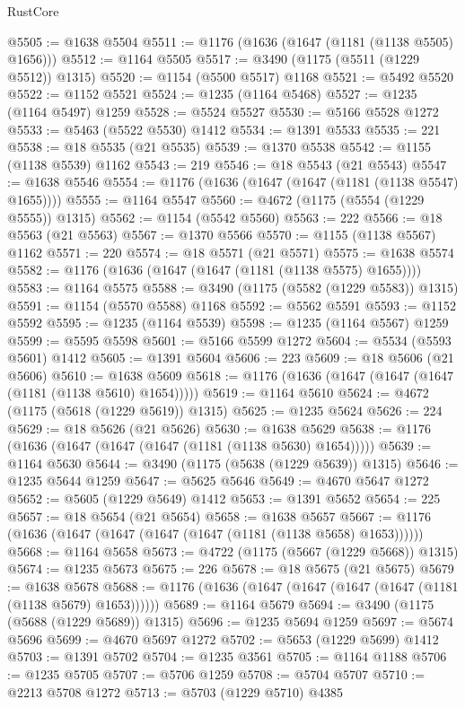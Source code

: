 \begin{lexlean}{RustCore}
\begin{coremodule}
@5505 := @1638 @5504
@5511 := @1176 (@1636 (@1647 (@1181 (@1138 @5505) @1656)))
@5512 := @1164 @5505
@5517 := @3490 (@1175 (@5511 (@1229 @5512)) @1315)
@5520 := @1154 (@5500 @5517) @1168
@5521 := @5492 @5520
@5522 := @1152 @5521
@5524 := @1235 (@1164 @5468)
@5527 := @1235 (@1164 @5497) @1259
@5528 := @5524 @5527
@5530 := @5166 @5528 @1272
@5533 := @5463 (@5522 @5530) @1412
@5534 := @1391 @5533
@5535 := 221
@5538 := @18 @5535 (@21 @5535)
@5539 := @1370 @5538
@5542 := @1155 (@1138 @5539) @1162
@5543 := 219
@5546 := @18 @5543 (@21 @5543)
@5547 := @1638 @5546
@5554 := @1176 (@1636 (@1647 (@1647 (@1181 (@1138 @5547) @1655))))
@5555 := @1164 @5547
@5560 := @4672 (@1175 (@5554 (@1229 @5555)) @1315)
@5562 := @1154 (@5542 @5560)
@5563 := 222
@5566 := @18 @5563 (@21 @5563)
@5567 := @1370 @5566
@5570 := @1155 (@1138 @5567) @1162
@5571 := 220
@5574 := @18 @5571 (@21 @5571)
@5575 := @1638 @5574
@5582 := @1176 (@1636 (@1647 (@1647 (@1181 (@1138 @5575) @1655))))
@5583 := @1164 @5575
@5588 := @3490 (@1175 (@5582 (@1229 @5583)) @1315)
@5591 := @1154 (@5570 @5588) @1168
@5592 := @5562 @5591
@5593 := @1152 @5592
@5595 := @1235 (@1164 @5539)
@5598 := @1235 (@1164 @5567) @1259
@5599 := @5595 @5598
@5601 := @5166 @5599 @1272
@5604 := @5534 (@5593 @5601) @1412
@5605 := @1391 @5604
@5606 := 223
@5609 := @18 @5606 (@21 @5606)
@5610 := @1638 @5609
@5618 := @1176 (@1636 (@1647 (@1647 (@1647 (@1181 (@1138 @5610) @1654)))))
@5619 := @1164 @5610
@5624 := @4672 (@1175 (@5618 (@1229 @5619)) @1315)
@5625 := @1235 @5624
@5626 := 224
@5629 := @18 @5626 (@21 @5626)
@5630 := @1638 @5629
@5638 := @1176 (@1636 (@1647 (@1647 (@1647 (@1181 (@1138 @5630) @1654)))))
@5639 := @1164 @5630
@5644 := @3490 (@1175 (@5638 (@1229 @5639)) @1315)
@5646 := @1235 @5644 @1259
@5647 := @5625 @5646
@5649 := @4670 @5647 @1272
@5652 := @5605 (@1229 @5649) @1412
@5653 := @1391 @5652
@5654 := 225
@5657 := @18 @5654 (@21 @5654)
@5658 := @1638 @5657
@5667 := @1176 (@1636 (@1647 (@1647 (@1647 (@1647 (@1181 (@1138 @5658) @1653))))))
@5668 := @1164 @5658
@5673 := @4722 (@1175 (@5667 (@1229 @5668)) @1315)
@5674 := @1235 @5673
@5675 := 226
@5678 := @18 @5675 (@21 @5675)
@5679 := @1638 @5678
@5688 := @1176 (@1636 (@1647 (@1647 (@1647 (@1647 (@1181 (@1138 @5679) @1653))))))
@5689 := @1164 @5679
@5694 := @3490 (@1175 (@5688 (@1229 @5689)) @1315)
@5696 := @1235 @5694 @1259
@5697 := @5674 @5696
@5699 := @4670 @5697 @1272
@5702 := @5653 (@1229 @5699) @1412
@5703 := @1391 @5702
@5704 := @1235 @3561
@5705 := @1164 @1188
@5706 := @1235 @5705
@5707 := @5706 @1259
@5708 := @5704 @5707
@5710 := @2213 @5708 @1272
@5713 := @5703 (@1229 @5710) @4385

\end{coremodule}
\end{lexlean}
